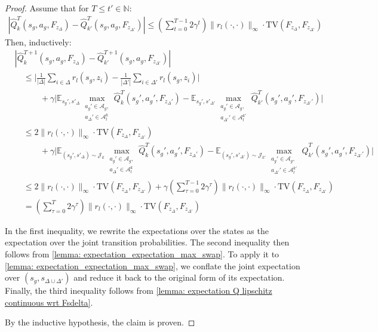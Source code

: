 \documentclass{article}
\theoremstyle{plain}
\theoremstyle{definition}
\def\E{\mathbb{E}}
\def\N{\mathbb{N}}
\begin{document}
\begin{proof}
Assume that for $T\leq t'\in\N$:
\begin{align*}\left|\hat{Q}^{T}_k(s_g, a_g,F_{z_\Delta}) - \hat{Q}_{k'}^{T}(s_g, a_g,F_{z_{\Delta'}})\right| \leq \left(\sum_{t=0}^{T-1}2\gamma^t\right)\|r_l(\cdot,\cdot)\|_\infty\cdot\mathrm{TV}\left(F_{z_\Delta}, F_{z_{\Delta'}}\right)\end{align*}
Then, inductively:
\begin{align*}
&|\hat{Q}^{T+1}_k(s_g, a_g,F_{z_\Delta}) - \hat{Q}_{k'}^{T+1}(s_g, a_g,F_{z_{\Delta'}})| \\
&\quad\leq \bigg|\frac{1}{|\Delta|}\sum_{i\in\Delta}r_l(s_g,z_i)-\frac{1}{|\Delta'|}\sum_{i\in\Delta'}r_l(s_g,z_i)\bigg| \\ 
& \quad\quad\quad +\gamma\bigg|\E_{s_g', s'_{\Delta}}\max_{\substack{a_g'\in\mathcal{A}_g,\\ a_\Delta'\in\mathcal{A}_l^k}}\hat{Q}_k^{T}(s_g', a_g',F_{z_\Delta'})-\E_{s_g', s'_{\Delta'}}\max_{\substack{a_g'\in\mathcal{A}_g,\\ a_{\Delta'}'\in \mathcal{A}_l^{k'}}}\hat{Q}_{k'}^{T}(s_g', a_g',F_{z_{\Delta'}'})\bigg| \\
&\quad\leq 2\|r_l(\cdot,\cdot)\|_\infty\cdot\mathrm{TV}(F_{z_\Delta}, F_{z_{\Delta'}}) \\
&\quad\quad\quad+ \gamma\bigg|\E_{(s_g', s'_{\Delta})\sim\mathcal{J}_k}\max_{\substack{a_g'\in\mathcal{A}_g,\\ a_\Delta'\in\mathcal{A}_l^k}}\hat{Q}_k^{T}(s_g', a_g',F_{z_\Delta'})-\E_{(s_g', s'_{\Delta'})\sim\mathcal{J}_{k'}}\max_{\substack{a_g'\in\mathcal{A}_g,\\ a_{\Delta'}'\in \mathcal{A}_l^{k'}}}\hat{Q}_{k'}^{T}(s_g', a_g', F_{z_{\Delta'}'})\bigg|\\
&\quad\leq 2\|r_l(\cdot,\cdot)\|_\infty\cdot\mathrm{TV}(F_{z_\Delta}, F_{z_{\Delta'}}) + \gamma\left(\sum_{\tau=0}^{T-1}2\gamma^\tau\right)\|r_l(\cdot,\cdot)\|_\infty\cdot\mathrm{TV}(F_{z_\Delta},  F_{z_{\Delta'}})\\
&\quad=\left(\sum_{\tau=0}^{T}2\gamma^\tau\right) \|r_l(\cdot,\cdot)\|_\infty\cdot\mathrm{TV}(F_{z_\Delta}, F_{z_{\Delta'}})
\end{align*}

\noindent In the first inequality, we rewrite the expectations over the states as the expectation over the joint transition probabilities. The second inequality then follows from \cref{lemma: expectation_expectation_max_swap}. To apply it to \cref{lemma: expectation_expectation_max_swap}, we conflate the joint expectation over $(s_g, s_{\Delta\cup\Delta'})$ and reduce it back to the original form of its expectation. Finally, the third inequality follows from \cref{lemma: expectation Q lipschitz continuous wrt Fsdelta}.

By the inductive hypothesis, the claim is proven.\qedhere
\end{proof}
\end{document}
